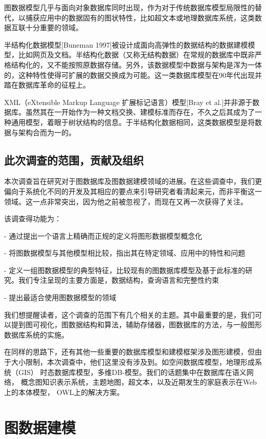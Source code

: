\documentclass[a4paper]{ecust_thesis_translation}
\begin{document}
		图数据模型几乎与面向对象数据库同时出现，作为对于传统数据库模型局限性的替代，以捕获应用中的数据固有的图状特性，比如超文本或地理数据库系统，这类数据互联十分重要的领域。

		半结构化数据模型[Buneman 1997]被设计成面向高弹性的数据结构的数据建模模型，比如网页及文档。半结构化数据（又称无结构数据）在常规的数据库中既非严格结构化的，又不能按照原数据存储。另外，该数据模型中数据与架构是浑为一体的，这种特性使得可扩展的数据交换成为可能。这一类数据库模型在90年代出现并踏在数据库革命的征程上。

		XML（eXtensible Markup Language 扩展标记语言）模型[Bray et al.]并非源于数据库。虽然其在一开始作为一种文档交换、建模标准而存在，不久之后其成为了一种通用模型，着眼于树状结构的信息。于半结构化数据相同，这类数据模型是将数据与架构合而为一的。

	\subsection{此次调查的范围，贡献及组织}
		
		本次调查旨在研究对于图数据库及图数据建模领域的进展。在这些调查中，我们更偏向于系统化不同的开发及其相应的要点来引导研究者看清起来元，而非平衡这一领域。这一点非常突出，因为他之前被忽视了，而现在又再一次获得了关注。

		该调查得功能为：

			- 通过提出一个语言上精确而正规的定义将图形数据模型概念化

			- 将图数据模型与其他模型相比较，指出其在特定领域、应用中的特性和问题

			- 定义一组图数据模型的典型特征，比较现有的图数据库模型及基于此标准的研究。我们专注呈现的主要方面是，数据结构，查询语言和完整性约束

			- 提出最适合使用图数据模型的领域

		我们想提醒读者，这个调查的范围下有几个相关的主题。其中最重要的是，我们可以提到图可视化，图数据结构和算法，辅助存储器，图数据库的方法，与一般图形数据库系统的实施。

		在同样的思路下，还有其他一些重要的数据库模型和建模框架涉及图形建模，但由于大小限制，本次调查中，他们这里没有涉及到。如空间数据库模型，地理形成系统（GIS） 时态数据库模型，多维DB-模型。我们的话题集中在数据库在语义网络， 概念图知识表示系统，主题地图，超文本，以及近期发生的家庭表示在Web上的本体模型， OWL上的解决方案。

\section{图数据建模}
\end{document}
